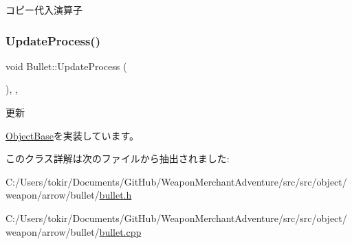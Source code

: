 コピー代入演算子 

\mbox{\label{class_bullet_aa0867038c9c35e30ee09e21ecdccf281}} 
\subsubsection{\texorpdfstring{Update\+Process()}{UpdateProcess()}}
{\footnotesize\ttfamily void Bullet\+::\+Update\+Process (\begin{DoxyParamCaption}{ }\end{DoxyParamCaption})\hspace{0.3cm}{\ttfamily [final]}, {\ttfamily [protected]}, {\ttfamily [virtual]}}



更新 



\mbox{\hyperlink{class_object_base_a8b5b72b363a419767efde0b0e692ea95}{Object\+Base}}を実装しています。



このクラス詳解は次のファイルから抽出されました\+:\begin{DoxyCompactItemize}
\item 
C\+:/\+Users/tokir/\+Documents/\+Git\+Hub/\+Weapon\+Merchant\+Adventure/src/src/object/weapon/arrow/bullet/\mbox{\hyperlink{bullet_8h}{bullet.\+h}}\item 
C\+:/\+Users/tokir/\+Documents/\+Git\+Hub/\+Weapon\+Merchant\+Adventure/src/src/object/weapon/arrow/bullet/\mbox{\hyperlink{bullet_8cpp}{bullet.\+cpp}}\end{DoxyCompactItemize}
